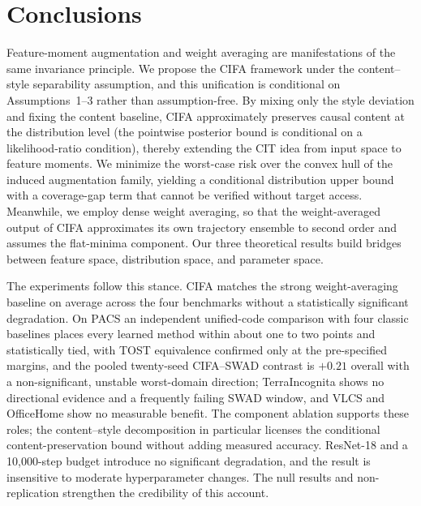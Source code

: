 \documentclass[electronics,article,submit,moreauthors]{Definitions/mdpi}
\newcommand{\add}[1]{\textcolor{addblue}{#1}}
\newcommand{\del}[1]{\textcolor{delred}{\st{#1}}}
\def\add#1{#1}%
\def\del#1{}%
\renewcommand{\add}[1]{#1}
\renewcommand{\del}[1]{}
\begin{document}
\section{Conclusions}

Feature-moment augmentation and weight averaging are manifestations of the same invariance principle. We propose the CIFA framework under the content--style separability assumption, and this unification is conditional on Assumptions~1--3 rather than assumption-free. By mixing only the style deviation and fixing the content baseline, CIFA approximately preserves causal content at the distribution level (the pointwise posterior bound is conditional on a likelihood-ratio condition), thereby extending the CIT idea from input space to feature moments. We minimize the worst-case risk over the convex hull of the induced augmentation family, yielding a conditional distribution upper bound with a coverage-gap term that cannot be verified without target access. Meanwhile, we employ dense weight averaging, so that the weight-averaged output of CIFA approximates its own trajectory ensemble to second order and assumes the flat-minima component. Our three theoretical results build bridges between feature space, distribution space, and parameter space.

The experiments follow this stance. CIFA matches the strong weight-averaging baseline on average across the four benchmarks without a statistically significant degradation. On PACS an independent unified-code comparison with four classic baselines places every learned method within about one to two points and statistically tied, with TOST equivalence confirmed only at the pre-specified margins, and the pooled twenty-seed CIFA--SWAD contrast is $+0.21$ overall with \del{a small, non-significant positive worst-domain tendency}\add{a non-significant, unstable worst-domain direction}; \del{TerraIncognita likewise keeps a positive but unconfirmed worst-domain direction,}\add{TerraIncognita shows no directional evidence and a frequently failing SWAD window,} and VLCS and OfficeHome show no measurable benefit. The component ablation supports these roles; the content--style decomposition in particular licenses the conditional content-preservation bound without adding measured accuracy. \del{The effect keeps its direction under ResNet-18 and a 10{,}000-step budget and is insensitive to moderate hyperparameter changes.}\add{ResNet-18 and a 10{,}000-step budget introduce no significant degradation, and the result is insensitive to moderate hyperparameter changes.} The null results and non-replication strengthen the credibility of this account.
\end{document}
